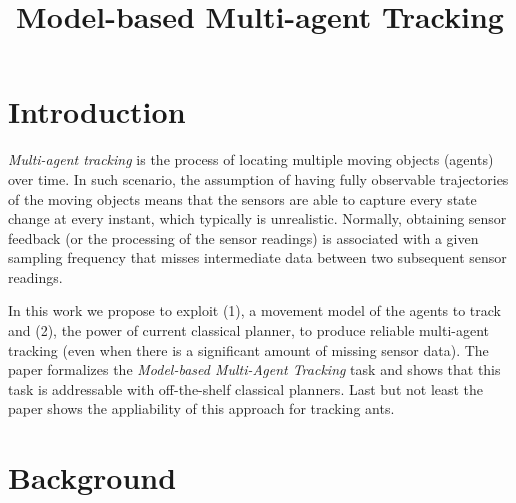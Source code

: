 \documentclass[letterpaper]{article} %
\begin{document}
\title{Model-based Multi-agent Tracking}




\maketitle
\begin{abstract}
\end{abstract}


\section{Introduction}
\label{sec:introduction}

{\em Multi-agent tracking} is the process of locating multiple moving objects (agents) over time. In such scenario, the assumption of having fully observable trajectories of the moving objects means that the sensors are able to capture every state change at every instant, which typically is unrealistic. Normally, obtaining sensor feedback (or the processing of the sensor readings) is associated with a given sampling frequency that misses intermediate data between two subsequent sensor readings.

In this work we propose to exploit (1), a movement model of the agents to track and (2), the power of current classical planner, to produce reliable multi-agent tracking (even when there is a significant amount of missing sensor data). The paper formalizes the {\em Model-based Multi-Agent Tracking} task and shows that this task is addressable with off-the-shelf classical planners. Last but not least the paper shows the appliability of this approach for tracking ants.


\section{Background}
\label{sec:background}
\end{document}
